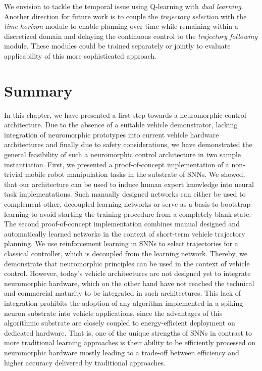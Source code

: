 We envision to tackle the temporal issue using Q-learning with \textit{dual learning}.
Another direction for future work is to couple the \emph{trajectory selection} with the \emph{time horizon} module to enable planning over time while remaining within a discretized domain and delaying the continuous control to the \emph{trajectory following} module.
These modules could be trained separately or jointly to evaluate applicability of this more sophisticated approach.


\section{Summary}%
\label{sec:summary_closed_loop_systems}

In this chapter, we have presented a first step towards a neuromorphic control architecture.
Due to the absence of a suitable vehicle demonstrator, lacking integration of neuromorphic prototypes into current vehicle hardware architectures and finally due to safety considerations, we have demonstrated the general feasibility of such a neuromorphic control architecture in two sample instantiation.
First, we presented a proof-of-concept implementation of a non-trivial mobile robot manipulation tasks in the substrate of \acp{SNN}.
We showed, that our architecture can be used to induce human expert knowledge into neural task implementations.
Such manually designed networks can either be used to complement other, decoupled learning networks or serve as a basis to bootstrap learning to avoid starting the training procedure from a completely blank state.
The second proof-of-concept implementation combines manual designed and automatically learned networks in the context of short-term vehicle trajectory planning.
We use reinforcement learning in \acp{SNN} to select trajectories for a classical controller, which is decoupled from the learning network.
Thereby, we demonstrate that neuromorphic principles can be used in the context of vehicle control.
However, today's vehicle architectures are not designed yet to integrate neuromorphic hardware, which on the other hand have not reached the technical and commercial maturity to be integrated in such architectures.
This lack of integration prohibits the adoption of any algorithm implemented in a spiking neuron substrate into vehicle applications, since the advantages of this algorithmic substrate are closely coupled to energy-efficient deployment on dedicated hardware.
That is, one of the unique strengths of \acp{SNN} in contrast to more traditional learning approaches is their ability to be efficiently processed on neuromorphic hardware mostly leading to a trade-off between efficiency and higher accuracy delivered by traditional approaches.


